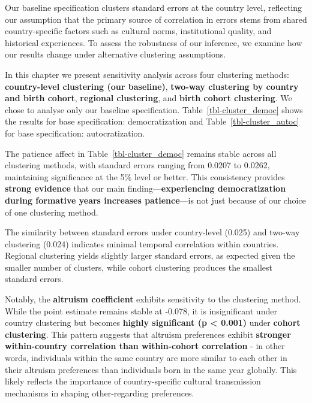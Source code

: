 \documentclass[
  letterpaper,
  DIV=11,
  numbers=noendperiod]{scrartcl}
\begin{document}
Our baseline specification clusters standard errors at the country
level, reflecting our assumption that the primary source of correlation
in errors stems from shared country-specific factors such as cultural
norms, institutional quality, and historical experiences. To assess the
robustness of our inference, we examine how our results change under
alternative clustering assumptions.

In this chapter we present sensitivity analysis across four clustering
methods: \textbf{country-level clustering (our baseline)},
\textbf{two-way clustering by country and birth cohort},
\textbf{regional clustering}, and \textbf{birth cohort clustering}. We
chose to analyse only our baseline specification.
Table~\ref{tbl-cluster_democ} shows the results for base specification:
democratization and Table~\ref{tbl-cluster_autoc} for base
specification: autocratization.

The patience affect in Table~\ref{tbl-cluster_democ} remains stable
across all clustering methods, with standard errors ranging from 0.0207
to 0.0262, maintaining significance at the 5\% level or better. This
consistency provides \textbf{strong evidence} that our main
finding---\textbf{experiencing democratization during formative years
increases patience}---is not just because of our choice of one
clustering method.

The similarity between standard errors under country-level (0.025) and
two-way clustering (0.024) indicates minimal temporal correlation within
countries. Regional clustering yields slightly larger standard errors,
as expected given the smaller number of clusters, while cohort
clustering produces the smallest standard errors.

Notably, the \textbf{altruism coefficient} exhibits sensitivity to the
clustering method. While the point estimate remains stable at -0.078, it
is insignificant under country clustering but becomes \textbf{highly
significant (p \textless{} 0.001)} under \textbf{cohort clustering}.
This pattern suggests that altruism preferences exhibit \textbf{stronger
within-country correlation than within-cohort correlation} - in other
words, individuals within the same country are more similar to each
other in their altruism preferences than individuals born in the same
year globally. This likely reflects the importance of country-specific
cultural transmission mechanisms in shaping other-regarding preferences.
\end{document}
